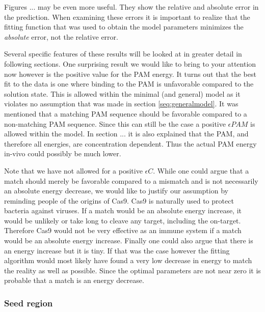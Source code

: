 
Figures ... %
may be even more useful. They show the relative and absolute error in the prediction. When examining these errors it is important to realize that the fitting function that was used to obtain the model parameters minimizes the \textit{absolute} error, not the relative error.


Several specific features of these results will be looked at in greater detail in following sections. One surprising result we would like to bring to your attention now however is the positive value for the PAM energy. It turns out that the best fit to the data is one where binding to the PAM is unfavorable compared to the solution state. This is allowed within the minimal (and general) model as it violates no assumption that was made in section \ref{seq:generalmodel}. It was mentioned that a matching PAM sequence should be favorable compared to a non-matching PAM sequence. Since this can still be the case a positive $\epsilon PAM$ is allowed within the model. In section ... %
it is also explained that the PAM, and therefore all energies, are concentration dependent. Thus the actual PAM energy in-vivo could possibly be much lower. %

Note that we have not allowed for a positive $\epsilon C$. While one could argue that a match should merely be favorable compared to a mismatch and is not necessarily an absolute energy decrease, we would like to justify our assumption by reminding people of the origins of Cas9. Cas9 is naturally used to protect bacteria against viruses. If a match would be an absolute energy increase, it would be unlikely or take long to cleave any target, including the on-target. Therefore Cas9 would not be very effective as an immune system if a match would be an absolute energy increase. Finally one could also argue that there is an energy increase but it is tiny. If that was the case however the fitting algorithm would most likely have found a very low decrease in energy to match the reality as well as possible. Since the optimal parameters are not near zero it is probable that a match is an energy decrease. 

\subsubsection{Seed region}
\label{sec:minmodelresultsseedregion}

